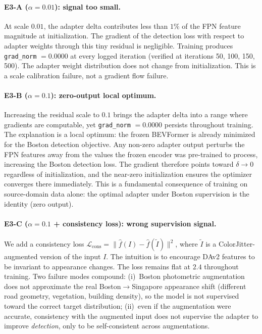 \documentclass[letterpaper, 10pt, journal]{IEEEtran}
\begin{document}
\paragraph{E3-A ($\alpha = 0.01$): signal too small.}
At scale $0.01$, the adapter delta contributes less than $1\%$ of the FPN feature
magnitude at initialization.
The gradient of the detection loss with respect to adapter weights through this tiny
residual is negligible.
Training produces \texttt{grad\_norm} $= 0.0000$ at every logged iteration
(verified at iterations 50, 100, 150, 500).
The adapter weight distribution does not change from initialization.
This is a scale calibration failure, not a gradient flow failure.

\paragraph{E3-B ($\alpha = 0.1$): zero-output local optimum.}
Increasing the residual scale to $0.1$ brings the adapter delta into a range where
gradients are computable, yet \texttt{grad\_norm} $= 0.0000$ persists throughout
training.
The explanation is a local optimum: the frozen BEVFormer is already minimized for
the Boston detection objective.
Any non-zero adapter output perturbs the FPN features away from the values the frozen
encoder was pre-trained to process, increasing the Boston detection loss.
The gradient therefore points toward $\delta \to 0$ regardless of initialization,
and the near-zero initialization ensures the optimizer converges there immediately.
This is a fundamental consequence of training on source-domain data alone: the
optimal adapter under Boston supervision is the identity (zero output).

\paragraph{E3-C ($\alpha = 0.1$ + consistency loss): wrong supervision signal.}
We add a consistency loss $\mathcal{L}_\text{cons} = \|\hat{f}(I) - \hat{f}(\tilde{I})\|^2$,
where $\tilde{I}$ is a ColorJitter-augmented version of the input $I$.
The intuition is to encourage DAv2 features to be invariant to appearance changes.
The loss remains flat at $2.4$ throughout training.
Two failure modes compound: (i)~Boston photometric augmentation does not approximate
the real Boston$\to$Singapore appearance shift (different road geometry, vegetation,
building density), so the model is not supervised toward the correct target distribution;
(ii)~even if the augmentation were accurate, consistency with the augmented input
does not supervise the adapter to improve \emph{detection}, only to be self-consistent
across augmentations.
\end{document}
